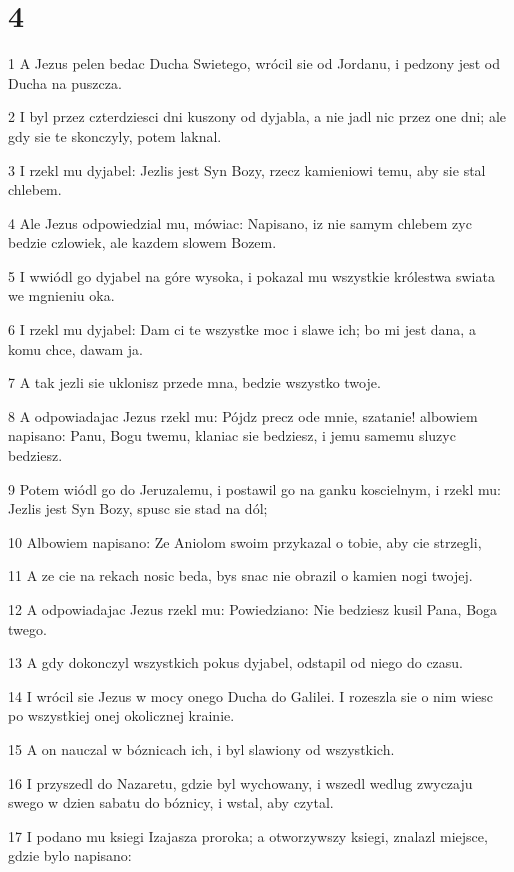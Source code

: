 \chapter{4}

\par 1 A Jezus pelen bedac Ducha Swietego, wrócil sie od Jordanu, i pedzony jest od Ducha na puszcza.
\par 2 I byl przez czterdziesci dni kuszony od dyjabla, a nie jadl nic przez one dni; ale gdy sie te skonczyly, potem laknal.
\par 3 I rzekl mu dyjabel: Jezlis jest Syn Bozy, rzecz kamieniowi temu, aby sie stal chlebem.
\par 4 Ale Jezus odpowiedzial mu, mówiac: Napisano, iz nie samym chlebem zyc bedzie czlowiek, ale kazdem slowem Bozem.
\par 5 I wwiódl go dyjabel na góre wysoka, i pokazal mu wszystkie królestwa swiata we mgnieniu oka.
\par 6 I rzekl mu dyjabel: Dam ci te wszystke moc i slawe ich; bo mi jest dana, a komu chce, dawam ja.
\par 7 A tak jezli sie uklonisz przede mna, bedzie wszystko twoje.
\par 8 A odpowiadajac Jezus rzekl mu: Pójdz precz ode mnie, szatanie! albowiem napisano: Panu, Bogu twemu, klaniac sie bedziesz, i jemu samemu sluzyc bedziesz.
\par 9 Potem wiódl go do Jeruzalemu, i postawil go na ganku koscielnym, i rzekl mu: Jezlis jest Syn Bozy, spusc sie stad na dól;
\par 10 Albowiem napisano: Ze Aniolom swoim przykazal o tobie, aby cie strzegli,
\par 11 A ze cie na rekach nosic beda, bys snac nie obrazil o kamien nogi twojej.
\par 12 A odpowiadajac Jezus rzekl mu: Powiedziano: Nie bedziesz kusil Pana, Boga twego.
\par 13 A gdy dokonczyl wszystkich pokus dyjabel, odstapil od niego do czasu.
\par 14 I wrócil sie Jezus w mocy onego Ducha do Galilei. I rozeszla sie o nim wiesc po wszystkiej onej okolicznej krainie.
\par 15 A on nauczal w bóznicach ich, i byl slawiony od wszystkich.
\par 16 I przyszedl do Nazaretu, gdzie byl wychowany, i wszedl wedlug zwyczaju swego w dzien sabatu do bóznicy, i wstal, aby czytal.
\par 17 I podano mu ksiegi Izajasza proroka; a otworzywszy ksiegi, znalazl miejsce, gdzie bylo napisano:
